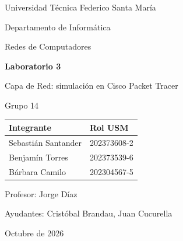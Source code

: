 \begin{titlepage}
  \centering
  {\large Universidad Técnica Federico Santa María\par}
  {\large Departamento de Informática\par}
  \vspace{1.5cm}
  {\Large Redes de Computadores\par}
  \vspace{0.8cm}
  {\huge\bfseries Laboratorio 3\par}
  {\Large Capa de Red: simulación en Cisco Packet Tracer\par}
  \vspace{1.2cm}
  {\Large Grupo 14\par}
  \vspace{1.5cm}

  \begin{tabular}{@{}ll@{}}
    \toprule
    \textbf{Integrante} & \textbf{Rol USM} \\
    \midrule
    Sebastián Santander & 202373608-2 \\
    Benjamín Torres     & 202373539-6 \\
    Bárbara Camilo      & 202304567-5 \\
    \bottomrule
  \end{tabular}

  \vspace{1.5cm}
  {\large Profesor: Jorge Díaz\par}
  {\large Ayudantes: Cristóbal Brandau, Juan Cucurella\par}
  \vfill
  {\large Octubre de 2026\par}
\end{titlepage}

